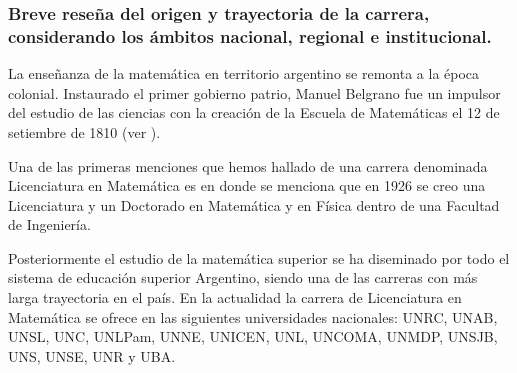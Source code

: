 \documentclass[a4paper, 12pt]{article}
\begin{document}
\subsubsection{Breve reseña del origen y trayectoria de la carrera, considerando los ámbitos nacional, regional e institucional.}

 La enseñanza de la matemática en territorio argentino se remonta a la  época colonial. Instaurado el primer gobierno patrio,  Manuel Belgrano fue un impulsor del estudio de las ciencias con  la creación de la   Escuela de Matemáticas  el 12 de setiembre de 1810 (ver \cite{stacco2011200}). 

 Una de las primeras menciones que hemos hallado de una carrera denominada Licenciatura en Matemática es en  \cite{ortiz2011julio} 
 donde se menciona que en  1926 se creo una Licenciatura y un Doctorado en Matemática y en Física dentro de una Facultad de Ingeniería. 

 Posteriormente el estudio de la matemática superior se ha diseminado por todo el sistema de educación superior Argentino, siendo una de las carreras con más larga trayectoria en el país. En la actualidad la carrera de Licenciatura en Matemática se ofrece en las siguientes universidades nacionales: UNRC, UNAB, UNSL, UNC, UNLPam, UNNE, UNICEN, UNL, UNCOMA, UNMDP, UNSJB, UNS, UNSE, UNR y UBA.  
 
\end{document}
